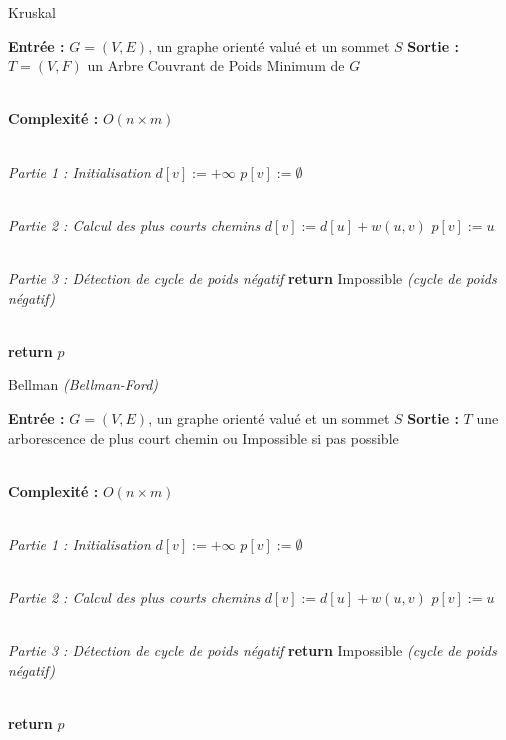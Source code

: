 \documentclass{article}      %
\begin{document}
\begin{algorithm} \caption{Kruskal}
\begin{algorithmic}

\State \textbf{Entrée :} $G = (V, E)$, un graphe orienté valué et un sommet $S$
\State \textbf{Sortie :} $T = (V, F)$ un Arbre Couvrant de Poids Minimum de $G$

\\ \State \textbf{Complexité :} $O(n\times m)$

\\ \State \textit{Partie 1 : Initialisation}
    \State $d[v] := +\infty$
    \State $p[v] := \emptyset$
\EndFor


\\ \State \textit{Partie 2 : Calcul des plus courts chemins}
            \State $d[v] := d[u] + w(u, v)$
            \State $p[v] := u$
        \EndIf
    \EndFor
\EndFor


\\ \State \textit{Partie 3 : Détection de cycle de poids négatif}
    \State \textbf{return} Impossible \textit{(cycle de poids négatif)}
    \EndIf
\EndFor

\\ \State \textbf{return} $p$
\end{algorithmic}
\end{algorithm}


\begin{algorithm} \caption{Bellman \textit{(Bellman-Ford)}}
\begin{algorithmic}

\State \textbf{Entrée :} $G = (V, E)$, un graphe orienté valué et un sommet $S$
\State \textbf{Sortie :} $T$ une arborescence de plus court chemin ou Impossible si pas possible

\\ \State \textbf{Complexité :} $O(n\times m)$

\\ \State \textit{Partie 1 : Initialisation}
    \State $d[v] := +\infty$
    \State $p[v] := \emptyset$
\EndFor


\\ \State \textit{Partie 2 : Calcul des plus courts chemins}
            \State $d[v] := d[u] + w(u, v)$
            \State $p[v] := u$
        \EndIf
    \EndFor
\EndFor


\\ \State \textit{Partie 3 : Détection de cycle de poids négatif}
    \State \textbf{return} Impossible \textit{(cycle de poids négatif)}
    \EndIf
\EndFor

\\ \State \textbf{return} $p$
\end{algorithmic}
\end{algorithm}
\end{document}
